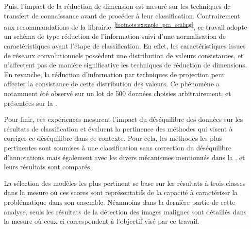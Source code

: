 Puis, l'impact de la réduction de dimension est mesuré sur les techniques de transfert de connaissance avant de procéder à leur classification. Contrairement aux recommandations de la librairie~\textsuperscript{\ref{footnote:exemple_pca_scaling}}, ce travail adopte un schéma de type réduction de l'information suivi d'une normalisation de caractéristiques avant l'étape de classification. En effet, les caractéristiques issues de réseaux convolutionnels possèdent une distribution de valeurs consistantes, et n'affectent pas de manière significative les techniques de réduction de dimensions. En revanche, la réduction d'information par techniques de projection peut affecter la consistance de cette distribution des valeurs. Ce phénomène a notamment été observé sur un lot de 500 données choisies arbitrairement, et présentées sur la .\par

Pour finir, ces expériences mesurent l'impact du déséquilibre des données sur les résultats de classification et évaluent la pertinence des méthodes qui visent à corriger ce déséquilibre dans ce contexte. Pour cela, les méthodes les plus pertinentes sont soumises à une classification sans correction du déséquilibre d'annotations mais également avec les divers mécanismes mentionnés dans la , et leurs résultats sont comparés.\par

La sélection des modèles les plus pertinent se base sur les résultats à trois classes dans la mesure où ces scores sont représentatifs de la capacité à caractériser la problématique dans son ensemble. Néanmoins dans la dernière partie de cette analyse, seuls les résultats de la détection des images malignes sont détaillés dans la mesure où ceux-ci correspondent à l'objectif visé par ce travail.\par

\addtocounter{footnote}{1}
\clearpage

